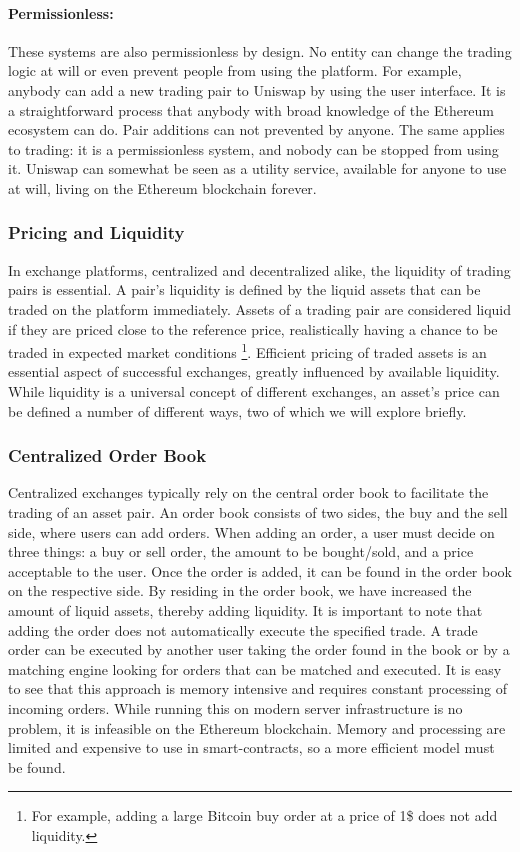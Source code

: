 \documentclass[../../thesis.tex]{subfiles}
\begin{document}
\paragraph{Permissionless:}
These systems are also permissionless by design. No entity can change the trading logic at will or even prevent people from using the platform. For example, anybody can add a new trading pair to Uniswap by using the user interface. It is a straightforward process that anybody with broad knowledge of the Ethereum ecosystem can do. Pair additions can not prevented by anyone. The same applies to trading: it is a permissionless system, and nobody can be stopped from using it. Uniswap can somewhat be seen as a utility service, available for anyone to use at will, living on the Ethereum blockchain forever.

\subsubsection{Pricing and Liquidity}
In exchange platforms, centralized and decentralized alike, the liquidity of trading pairs is essential. A pair's liquidity is defined by the liquid assets that can be traded on the platform immediately. Assets of a trading pair are considered liquid if they are priced close to the reference price, realistically having a chance to be traded in expected market conditions \footnote{For example, adding a large Bitcoin buy order at a price of 1\$ does not add liquidity.}. Efficient pricing of traded assets is an essential aspect of successful exchanges, greatly influenced by available liquidity. While liquidity is a universal concept of different exchanges, an asset's price can be defined a number of different ways, two of which we will explore briefly. 

\subsubsection{Centralized Order Book}
Centralized exchanges typically rely on the central order book to facilitate the trading of an asset pair. An order book consists of two sides, the buy and the sell side, where users can add orders. When adding an order, a user must decide on three things: a buy or sell order, the amount to be bought/sold, and a price acceptable to the user. Once the order is added, it can be found in the order book on the respective side. By residing in the order book, we have increased the amount of liquid assets, thereby adding liquidity. It is important to note that adding the order does not automatically execute the specified trade. A trade order can be executed by another user taking the order found in the book or by a matching engine looking for orders that can be matched and executed. It is easy to see that this approach is memory intensive and requires constant processing of incoming orders. While running this on modern server infrastructure is no problem, it is infeasible on the Ethereum blockchain. Memory and processing are limited and expensive to use in smart-contracts, so a more efficient model must be found.
\end{document}
